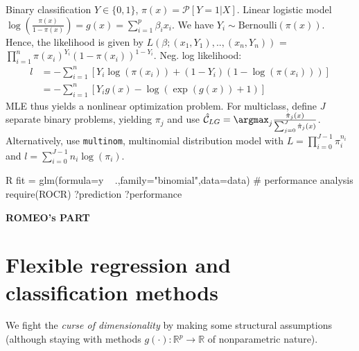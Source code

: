 \begin{sectionbox}
Binary classification $Y \in \{0,1\}$, $\pi(x) = \mathcal{P}[Y=1|X]$. Linear logistic model $\log(\frac{\pi(x)}{1- \pi(x)}) = g(x) = \sum_{i=1}^p \beta_i x_i$. We have $Y_i \sim \text{Bernoulli}(\pi(x))$. Hence, the likelihood is given by $L(\beta;(x_1,Y_1),..,(x_n,Y_n))$ = $\prod_{i=1}^{n}\pi(x_i)^{Y_i}(1-\pi(x_i))^{1-Y_i}$. Neg. log likelihood:
\begin{align*}
	l &= -\sum_{i=1}^{n}[ Y_i \log{(\pi(x_i))} + (1-Y_i)(1- \log{(\pi(x_i))})] \\
	&=  -\sum_{i=1}^{n}[Y_i g(x) - \log{(\exp{(g(x))} + 1)}]
\end{align*}
MLE thus yields a nonlinear optimization problem. For multiclass, define $J$ separate binary problems, yielding $\pi_j$  and use $\hat{\mathcal{C}}_{LG} = \argmax_{j} \frac{\hat{\pi}_j(x)}{\sum_{j=0}^J \hat{\pi}_j(x)}$. Alternatively, use \texttt{multinom}, multinomial distribution model with $L=\prod_{i=0}^{J-1}\pi_i^{n_i}$ and $l=\sum_{i=0}^{J-1}n_i\log{(\pi_i)}$.
\begin{mintlinebox}{R}
fit = glm(formula=y ~ .,family="binomial",data=data)
# performance analysis
require(ROCR) ?prediction ?performance
\end{mintlinebox}	
\end{sectionbox}


\textbf{ROMEO's PART}
\section{Flexible regression and classification methods}\label{sec:flexible_regression_and_classification_methods}
We fight the \emph{curse of dimensionality} by making some structural assumptions (although staying with methods $g(\cdot): \mathbb{R}^p \to \mathbb{R}$ of nonparametric nature).
